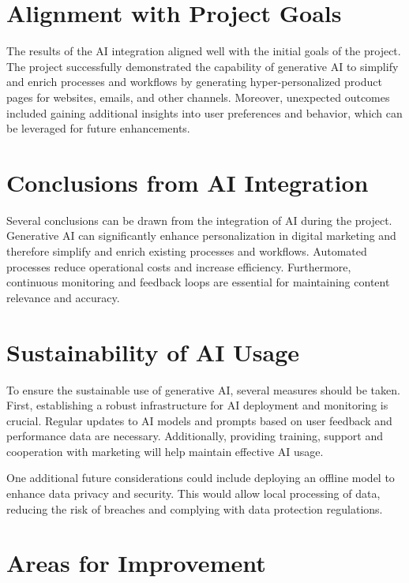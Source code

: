 \documentclass[%
pdftex,
oneside,			%
11pt,				%
parskip=half,		%
headheight = 12pt,	%
headsepline,		%
footsepline,		%
footheight = 16pt,	%
abstracton,		%
DIV=calc,		%
BCOR=8mm,		%
headinclude=false,	%
footinclude=false,	%
listof=totoc,		%
toc=bibliography,	%
]{scrreprt}	%
\begin{document}
    \section{Alignment with Project Goals}

        The results of the AI integration aligned well with the initial goals of the project. 
        The project successfully demonstrated the capability of generative AI to simplify and enrich processes and workflows by generating hyper-personalized product pages for websites, emails, and other channels.
        Moreover, unexpected outcomes included gaining additional insights into user preferences and behavior, which can be leveraged for future enhancements.

    \section{Conclusions from AI Integration}

        Several conclusions can be drawn from the integration of AI during the project. 
        Generative AI can significantly enhance personalization in digital marketing and therefore simplify and enrich existing processes and workflows.
        Automated processes reduce operational costs and increase efficiency. 
        Furthermore, continuous monitoring and feedback loops are essential for maintaining content relevance and accuracy.

    \section{Sustainability of AI Usage}

        To ensure the sustainable use of generative AI, several measures should be taken. 
        First, establishing a robust infrastructure for AI deployment and monitoring is crucial. 
        Regular updates to AI models and prompts based on user feedback and performance data are necessary. 
        Additionally, providing training, support and cooperation with marketing will help maintain effective AI usage.

        One additional future considerations could include deploying an offline model to enhance data privacy and security. 
        This would allow local processing of data, reducing the risk of breaches and complying with data protection regulations. 


    \section{Areas for Improvement}
\end{document}
